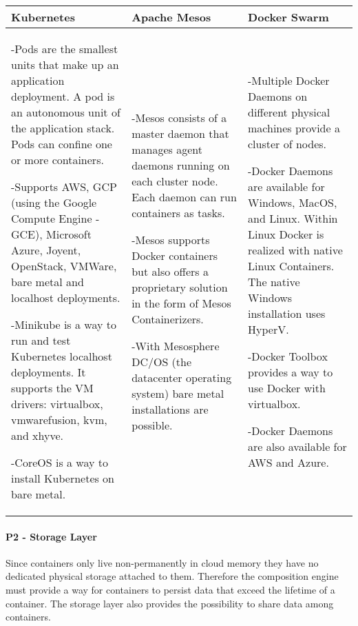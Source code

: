 \begin{center}
  \begin{tabular}{ | p{4.5cm} | p{4.5cm} | p{4.5cm} | }
    \hline
    \textbf{Kubernetes}&\textbf{Apache Mesos}&\textbf{Docker Swarm}\\\hline
    -Pods are the smallest units that make up an application deployment. A pod
    is an autonomous unit of the application stack. Pods can confine one or more
    containers.
    
    -Supports AWS, GCP (using the Google Compute Engine - GCE), Microsoft Azure,
    Joyent, OpenStack, VMWare, bare metal and localhost deployments.
    
    -Minikube is a way to run and test Kubernetes localhost deployments. It
    supports the VM drivers: virtualbox, vmwarefusion, kvm, and xhyve.
    
    -CoreOS is a way to install Kubernetes on bare metal.&
    
    -Mesos consists of a master daemon that manages agent daemons running on
    each cluster node. Each daemon can run containers as tasks. 
    
    -Mesos supports Docker containers but also offers a proprietary solution in
    the form of Mesos Containerizers.
    
    -With Mesosphere DC/OS (the datacenter operating system) bare metal
    installations are possible. &
    
    -Multiple Docker Daemons on different physical machines provide a cluster
    of nodes.
    
    -Docker Daemons are available for Windows, MacOS, and Linux. Within Linux
    Docker is realized with native Linux Containers. The native Windows
    installation uses HyperV.
    
    -Docker Toolbox provides a way to use Docker with virtualbox.
    
    -Docker Daemons are also available for AWS and Azure.\\
    \hline
  \end{tabular}
\end{center}


\newpage
\paragraph{P2 - Storage Layer}

Since containers only live non-permanently in cloud memory they have no
dedicated physical storage attached to them. Therefore the composition engine
must provide a way for containers to persist data that exceed the lifetime of a
container. The storage layer also provides the possibility to share data among
containers.

